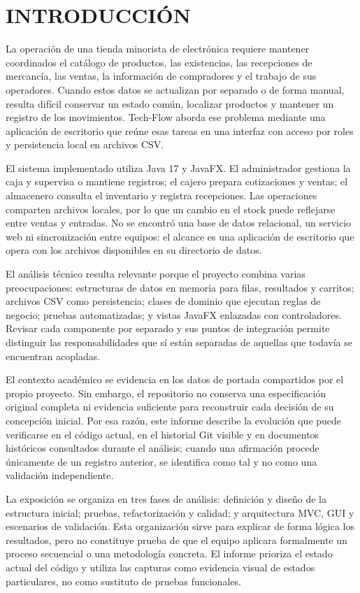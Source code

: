 \section*{INTRODUCCIÓN}

La operación de una tienda minorista de electrónica requiere mantener coordinados el catálogo de productos, las existencias, las recepciones de mercancía, las ventas, la información de compradores y el trabajo de sus operadores. Cuando estos datos se actualizan por separado o de forma manual, resulta difícil conservar un estado común, localizar productos y mantener un registro de los movimientos. Tech-Flow aborda ese problema mediante una aplicación de escritorio que reúne esas tareas en una interfaz con acceso por roles y persistencia local en archivos CSV.

El sistema implementado utiliza Java 17 y JavaFX. El administrador gestiona la caja y supervisa o mantiene registros; el cajero prepara cotizaciones y ventas; el almacenero consulta el inventario y registra recepciones. Las operaciones comparten archivos locales, por lo que un cambio en el stock puede reflejarse entre ventas y entradas. No se encontró una base de datos relacional, un servicio web ni sincronización entre equipos: el alcance es una aplicación de escritorio que opera con los archivos disponibles en su directorio de datos.

El análisis técnico resulta relevante porque el proyecto combina varias preocupaciones: estructuras de datos en memoria para filas, resultados y carritos; archivos CSV como persistencia; clases de dominio que ejecutan reglas de negocio; pruebas automatizadas; y vistas JavaFX enlazadas con controladores. Revisar cada componente por separado y sus puntos de integración permite distinguir las responsabilidades que sí están separadas de aquellas que todavía se encuentran acopladas.

El contexto académico se evidencia en los datos de portada compartidos por el propio proyecto. Sin embargo, el repositorio no conserva una especificación original completa ni evidencia suficiente para reconstruir cada decisión de su concepción inicial. Por esa razón, este informe describe la evolución que puede verificarse en el código actual, en el historial Git visible y en documentos históricos consultados durante el análisis; cuando una afirmación procede únicamente de un registro anterior, se identifica como tal y no como una validación independiente.

La exposición se organiza en tres fases de análisis: definición y diseño de la estructura inicial; pruebas, refactorización y calidad; y arquitectura MVC, GUI y escenarios de validación. Esta organización sirve para explicar de forma lógica los resultados, pero no constituye prueba de que el equipo aplicara formalmente un proceso secuencial o una metodología concreta. El informe prioriza el estado actual del código y utiliza las capturas como evidencia visual de estados particulares, no como sustituto de pruebas funcionales.
